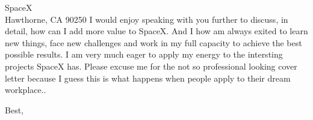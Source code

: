 \documentclass{letter} %
\begin{document}
\begin{letter}{%
SpaceX \\  Hawthorne, CA 90250
}
\noindent 
I would enjoy speaking with you further to discuss, in detail, how can I add
more value to SpaceX. And I how am always exited to learn new things, face new
challenges and work in my full capacity to achieve the best possible results. I
am very much eager to apply my energy to the intersting projects SpaceX has.
Please excuse me for the not so professional looking cover letter because I
guess this is what happens when people apply to their dream workplace.. 

 
\closing{Best,} 
 
\end{letter}
 
\end{document}

